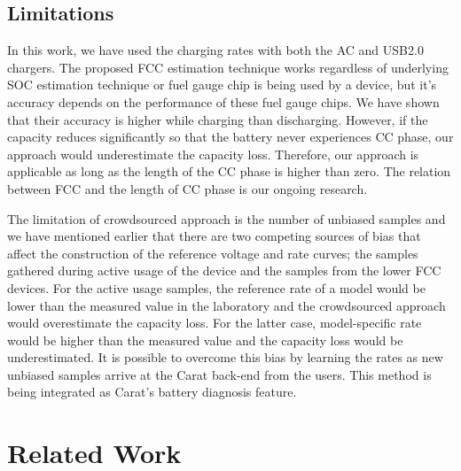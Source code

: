 \documentclass[journal]{IEEEtran}
\begin{document}
\subsection{Limitations}
In this work, we have used the charging rates with both the AC and USB2.0 chargers. The proposed FCC estimation technique works regardless of underlying SOC estimation technique or fuel gauge chip is being used by a device, but it's accuracy depends on the performance of these fuel gauge chips. We have shown that their accuracy is higher while charging than discharging. However, if the capacity reduces significantly so that the battery never experiences CC phase, our approach would underestimate the capacity loss. Therefore, our approach is applicable as long as the length of the CC phase is higher than zero. The relation between FCC and the length of CC phase is our ongoing research. 


The limitation of crowdsourced approach is the number of unbiased samples and we have mentioned earlier that there are two competing  sources of bias that affect the construction of the reference voltage and rate curves; the samples gathered during active usage of the device and the samples from the lower FCC devices. For the active usage samples, the reference rate of a model would be lower than the measured value in the laboratory and the crowdsourced approach would overestimate the capacity loss. For the latter case, model-specific rate would be higher than the measured value and the capacity loss would be underestimated. It is possible to overcome this bias by learning the rates as new unbiased samples arrive at the Carat back-end from the users. This  method is being integrated as Carat's battery diagnosis feature. 



\section{Related Work}
\label{sec:eight}
\end{document}

